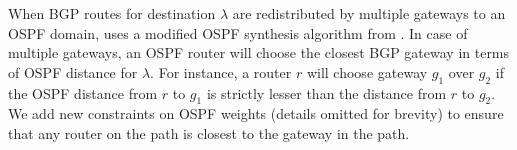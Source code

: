 When BGP routes for destination $\lambda$ 
are redistributed by multiple gateways to an 
OSPF domain, \name uses a modified OSPF synthesis
algorithm from .
In case of multiple gateways, an OSPF router will choose
the closest BGP gateway in terms of OSPF distance 
for $\lambda$. For instance, a router $r$ will choose
gateway $g_1$ over $g_2$ if the OSPF distance from $r$ to $g_1$ 
is strictly lesser than the distance from $r$ to $g_2$. 
We add new constraints on OSPF weights (details omitted for brevity) 
to ensure that any router on the path is closest to the gateway in the path.


